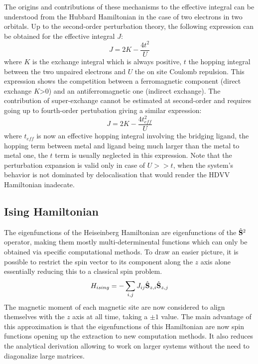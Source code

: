 \documentclass[12pt]{report}
\numberwithin{equation}{section}
\begin{document}
The origins and contributions of these mechanisms to the effective integral can be understood from the Hubbard Hamiltonian in the case of two electrons in two orbitals.
Up to the second-order perturbation theory, the following expression can be obtained for the effective integral $J$:
\begin{equation}
    J=2K-\frac{4t^2}{U}
\end{equation}
where $K$ is the exchange integral which is always positive, $t$ the hopping integral between the two unpaired electrons and $U$ the on site Coulomb repulsion.
This expression shows the competition between a ferromagnetic component (direct exchange $K$>0) and an antiferromagnetic one (indirect exchange).
The contribution of super-exchange cannot be estimated at second-order and requires going up to fourth-order pertubation giving a similar expression:
\begin{equation}
    J=2K-\frac{4t_{eff}^2}{U}
\end{equation}
where $t_{eff}$ is now an effective hopping integral involving the bridging ligand, the hopping term between metal and ligand being much larger than the metal to metal one, the $t$ term is usually neglected in this expression.
Note that the perturbation expansion is valid only in case of $U>>t$, when the system's behavior is not dominated by delocalisation that would render the HDVV Hamiltonian inadecate.

\subsection*{Ising Hamiltonian}

The eigenfunctions of the Heiseinberg Hamiltonian are eigenfunctions of the $\hat{\vb S}^2$ operator, making them mostly multi-determinental functions which can only be obtained via specific computational methods.
To draw an easier picture, it is possible to restrict the spin vector to its component along the $z$ axis alone essentially reducing this to a classical spin problem.
\begin{equation}
    H_{ising}=- \sum_{i,j} J_{ij} \hat{\vb S}_{z,i} \hat{\vb S}_{z,j}
\end{equation}
The magnetic moment of each magnetic site are now considered to align themselves with the $z$ axis at all time, taking a $\pm 1$ value.
The main advantage of this approximation is that the eigenfunctions of this Hamiltonian are now spin functions opening up the extraction to new computation methods. 
It also reduces the analytical derivation allowing to work on larger systems without the need to diagonalize large matrices.
\end{document}
